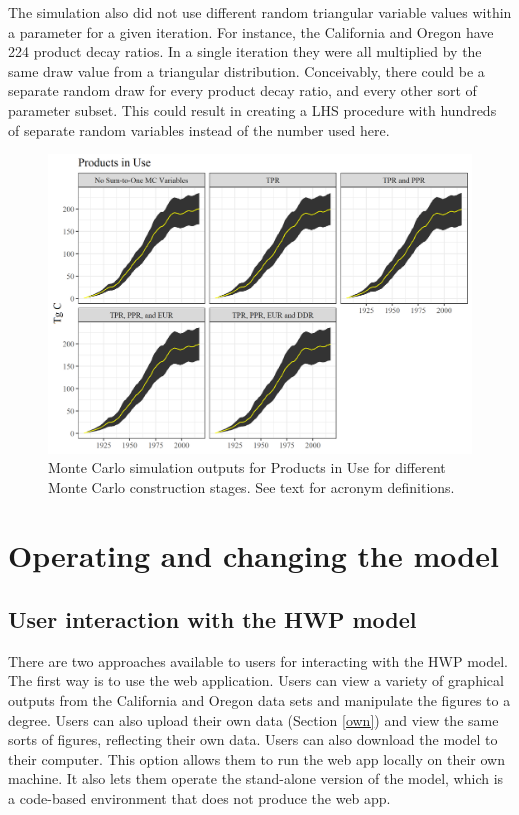 \documentclass[
]{book}
\begin{document}
The simulation also did not use different random triangular variable values within a parameter for a given iteration. For instance, the California and Oregon have 224 product decay ratios. In a single iteration they were all multiplied by the same draw value from a triangular distribution. Conceivably, there could be a separate random draw for every product decay ratio, and every other sort of parameter subset. This could result in creating a LHS procedure with hundreds of separate random variables instead of the number used here.

\begin{figure}
\includegraphics[width=1\linewidth]{images/MC_tests4} \caption{Monte Carlo simulation outputs for Products in Use for different Monte Carlo construction stages.  See text for acronym definitions.}\label{fig:mc-tests4-fig}
\end{figure}

\hypertarget{run}{%
\chapter{Operating and changing the model}\label{run}}

\hypertarget{run-sum}{%
\section{User interaction with the HWP model}\label{run-sum}}

There are two approaches available to users for interacting with the HWP model. The first way is to use the web application. Users can view a variety of graphical outputs from the California and Oregon data sets and manipulate the figures to a degree. Users can also upload their own data (Section \ref{own}) and view the same sorts of figures, reflecting their own data. Users can also download the model to their computer. This option allows them to run the web app locally on their own machine. It also lets them operate the stand-alone version of the model, which is a code-based environment that does not produce the web app.
\end{document}
